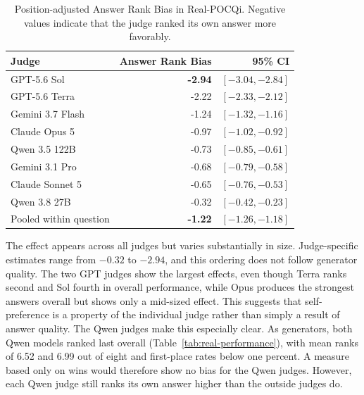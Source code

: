 \documentclass[11pt]{article}
\begin{document}
\begin{table}[htbp]
\centering
\small
\caption{Position-adjusted Answer Rank Bias in Real-POCQi. Negative
values indicate that the judge ranked its own answer more favorably.}
\label{tab:real-self}
\begin{tabular}{lrr}
\toprule
Judge & Answer Rank Bias & 95\% CI \\
\midrule
GPT-5.6 Sol & \textbf{-2.94} & $[-3.04,-2.84]$ \\
GPT-5.6 Terra & -2.22 & $[-2.33,-2.12]$ \\
Gemini 3.7 Flash & -1.24 & $[-1.32,-1.16]$ \\
Claude Opus 5 & -0.97 & $[-1.02,-0.92]$ \\
Qwen 3.5 122B & -0.73 & $[-0.85,-0.61]$ \\
Gemini 3.1 Pro & -0.68 & $[-0.79,-0.58]$ \\
Claude Sonnet 5 & -0.65 & $[-0.76,-0.53]$ \\
Qwen 3.8 27B & -0.32 & $[-0.42,-0.23]$ \\
\midrule
Pooled within question & \textbf{-1.22} & $\boldsymbol{[-1.26,-1.18]}$ \\
\bottomrule
\end{tabular}
\end{table}
\FloatBarrier

The effect appears across all judges but varies substantially in size. Judge-specific estimates range from $-0.32$ to $-2.94$, and this ordering does not follow generator quality. The two GPT judges show the largest effects, even though Terra ranks second and Sol fourth in overall performance, while Opus produces the strongest answers overall but shows only a mid-sized effect. This suggests that self-preference is a property of the individual judge rather than simply a result of answer quality. The Qwen judges make this especially clear. As generators, both Qwen models ranked last overall (Table~\ref{tab:real-performance}), with mean ranks of 6.52 and 6.99 out of eight and first-place rates below one percent. A measure based only on wins would therefore show no bias for the Qwen judges. However, each Qwen judge still ranks its own answer higher than the outside judges do.
\end{document}
